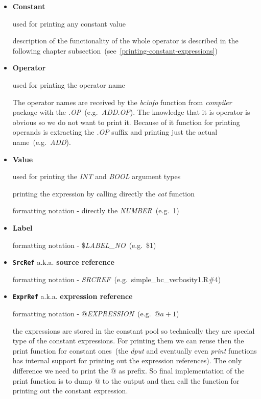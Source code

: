 \documentclass[thesis=M,english]{FITthesis}[2018/10/20]
\newcommand{\code}[1]{\texttt{#1}}
\begin{document}
\begin{itemize}
	\item \textbf{Constant}
		
		used for printing any constant value
		
		description of the functionality of the whole operator is described in the following chapter subsection~(see~\ref{printing-constant-expressions})
		
	\item \textbf{Operator}
		
		used for printing the operator name
		
		The operator names are received by the \textit{bcinfo} function from \textit{compiler} package with the \textit{.OP}~(e.g.~\textit{ADD.OP}). The knowledge that it is operator is obvious so we do not want to print it. Because of it function for printing operands is extracting the \textit{.OP} suffix and printing just the actual name~(e.g.~\textit{ADD}).
		
	\item \textbf{Value}
	
		used for printing the \textit{INT} and \textit{BOOL} argument types
		
		printing the expression by calling directly the \textit{cat} function

	formatting notation - directly the \textit{NUMBER}~(e.g.~1)
		
	\item \textbf{Label}

	formatting notation - \$\textit{LABEL{\_}NO}~(e.g.~\$1)
	
	\item \textbf{\code{SrcRef}} a.k.a. \textbf{source reference}  
	
	formatting notation - \textit{SRCREF}~(e.g.~simple{\_}bc{\_}verbosity1.R{\#}4)
	 
	\item \textbf{\code{ExprRef}} a.k.a. \textbf{expression reference}
	
	formatting notation - $@$\textit{EXPRESSION}~(e.g.~$@a+1$)

	the expressions are stored in the constant pool so technically they are special type of the constant expressions. For printing them we can reuse then the print function for constant ones~(the \textit{dput} and eventually even \textit{print} functions has internal support for printing out the expression references). The only difference we need to print the $@$ as prefix. So final implementation of the print function is to dump $@$ to the output and then call the function for printing out the constant expression.
	
\end{itemize}
\end{document}
